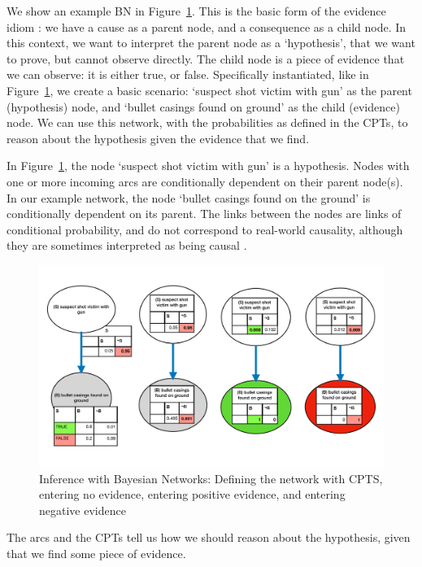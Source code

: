 \documentclass[12pt]{article}
\begin{document}
We show an example BN in Figure~\ref{exampleBN}. This is the basic form of the evidence idiom \citep{Fenton2012}: we have a cause as a parent node, and a consequence as a child node. In this context, we want to interpret the parent node as a `hypothesis', that we want to prove, but cannot observe directly. The child node is a piece of evidence that we can observe: it is either true, or false. Specifically instantiated, like in Figure~\ref{exampleBN}, we create a basic scenario: `suspect shot victim with gun' as the parent (hypothesis) node, and `bullet casings found on ground' as the child (evidence) node. We can use this network, with the probabilities as defined in the CPTs, to reason about the hypothesis given the evidence that we find.
 
In Figure~\ref{exampleBN}, the node `suspect shot victim with gun' is a hypothesis. Nodes with one or more incoming arcs are conditionally dependent on their parent node(s). In our example network, the node `bullet casings found on the ground' is conditionally dependent on its parent. The links between the nodes are links of conditional probability, and do not correspond to real-world causality, although they are sometimes interpreted as being causal \citep{Dawid2008}.

\begin{figure}[htbp]
\begin{center}
\includegraphics[width=\linewidth]{images/basicBayes}
\caption{Inference with Bayesian Networks: Defining the network with CPTS, entering no evidence, entering positive evidence, and entering negative evidence}
\label{exampleBN}
\end{center}
\end{figure}


The arcs and the CPTs tell us how we should reason about the hypothesis, given that we find some piece of evidence.
\end{document}
